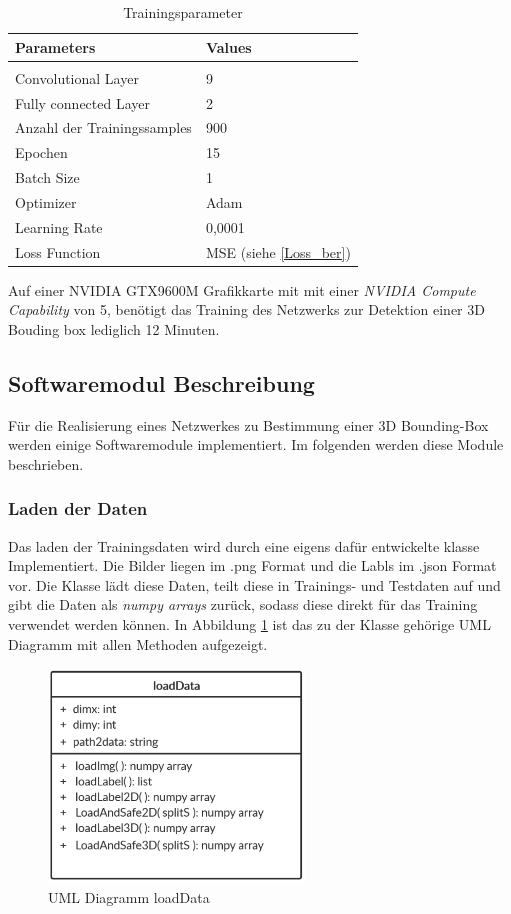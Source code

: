 \begin{table}[!htb]

\centering
\caption{Trainingsparameter}
\begin{tabular}{ll}
\label{trainings_param}
\textbf{Parameters}                  & \textbf{Values} \\ \hline
\\Convolutional Layer        & 9      \\
Fully connected Layer       & 2      \\
Anzahl der Trainingssamples & 900    \\
Epochen                  & 15     \\
Batch Size                  & 1     \\
Optimizer                   & Adam   \\
Learning Rate               & 0,0001 \\
Loss Function               & MSE (siehe \ref{Loss_ber})   
\end{tabular}
\end{table}
Auf einer NVIDIA GTX9600M Grafikkarte mit mit einer \textit{NVIDIA Compute Capability} von 5, benötigt das Training des Netzwerks zur Detektion einer 3D Bouding box lediglich 12 Minuten.
  
\subsection{Softwaremodul Beschreibung}
Für die Realisierung eines Netzwerkes zu Bestimmung einer 3D Bounding-Box werden einige Softwaremodule implementiert. Im folgenden werden diese Module beschrieben. 
\subsubsection{Laden der Daten}
Das laden der Trainingsdaten wird durch eine eigens dafür entwickelte klasse Implementiert. Die Bilder liegen im .png Format und die Labls im .json Format vor. Die Klasse lädt diese Daten, teilt diese in Trainings- und Testdaten auf und gibt die Daten als \textit{numpy arrays} zurück, sodass diese direkt für das Training verwendet werden können. In Abbildung \ref{UML_load} ist das zu der Klasse gehörige UML Diagramm mit allen Methoden aufgezeigt.
\begin{figure}[!htb]
  \centering
  \includegraphics[width=6.8cm]{Abb/ULM_class_loadData.PNG}
  \caption{UML Diagramm loadData}
  \label{UML_load}
\end{figure} 
